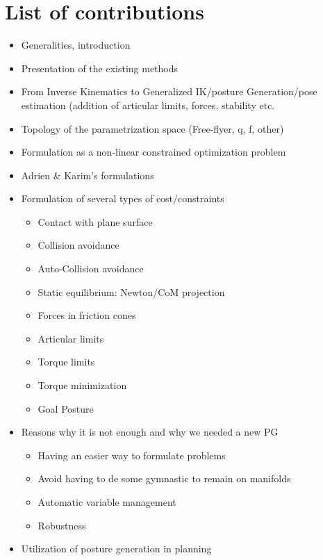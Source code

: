 \section{List of contributions}
\begin{itemize}
  \item Generalities, introduction
  \item Presentation of the existing methods
  \item From Inverse Kinematics to Generalized IK/posture Generation/pose estimation (addition of articular limits, forces, stability etc.
  \item Topology of the parametrization space (Free-flyer, q, f, other)
  \item Formulation as a non-linear constrained optimization problem
  \item Adrien \& Karim's formulations
  \item Formulation of several types of cost/constraints
  \begin{itemize}
    \item Contact with plane surface
    \item Collision avoidance
    \item Auto-Collision avoidance
    \item Static equilibrium: Newton/CoM projection
    \item Forces in friction cones
    \item Articular limits
    \item Torque limits
    \item Torque minimization
    \item Goal Posture
  \end{itemize}
  \item Reasons why it is not enough and why we needed a new PG
    \begin{itemize}
      \item Having an easier way to formulate problems
      \item Avoid having to de some gymnastic to remain on manifolds
      \item Automatic variable management
      \item Robustness
    \end{itemize}
  \item Utilization of posture generation in planning
\end{itemize}



